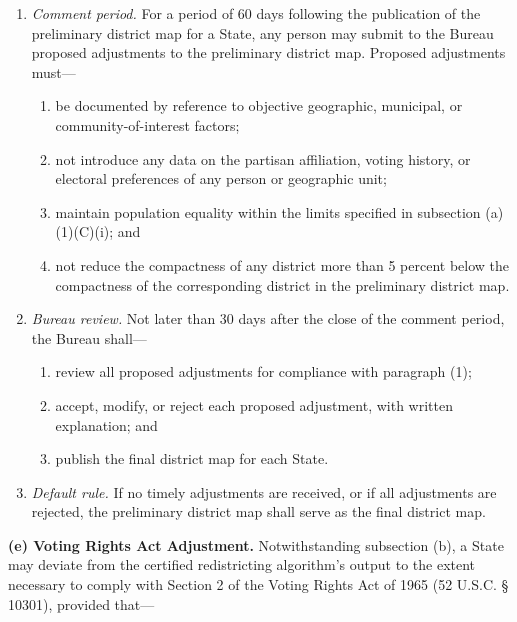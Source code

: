 \begin{enumerate}[label=(\arabic*)]
    \item \textit{Comment period.} For a period of 60 days following the publication of the preliminary district map for a State, any person may submit to the Bureau proposed adjustments to the preliminary district map. Proposed adjustments must---
    \begin{enumerate}[label=(\Alph*)]
        \item be documented by reference to objective geographic, municipal, or community-of-interest factors;
        \item not introduce any data on the partisan affiliation, voting history, or electoral preferences of any person or geographic unit;
        \item maintain population equality within the limits specified in subsection (a)(1)(C)(i); and
        \item not reduce the compactness of any district more than 5 percent below the compactness of the corresponding district in the preliminary district map.
    \end{enumerate}

    \item \textit{Bureau review.} Not later than 30 days after the close of the comment period, the Bureau shall---
    \begin{enumerate}[label=(\Alph*)]
        \item review all proposed adjustments for compliance with paragraph (1);
        \item accept, modify, or reject each proposed adjustment, with written explanation; and
        \item publish the final district map for each State.
    \end{enumerate}

    \item \textit{Default rule.} If no timely adjustments are received, or if all adjustments are rejected, the preliminary district map shall serve as the final district map.
\end{enumerate}

\textbf{(e) Voting Rights Act Adjustment.} Notwithstanding subsection (b), a State may deviate from the certified redistricting algorithm's output to the extent necessary to comply with Section 2 of the Voting Rights Act of 1965 (52 U.S.C. \S\,10301), provided that---

